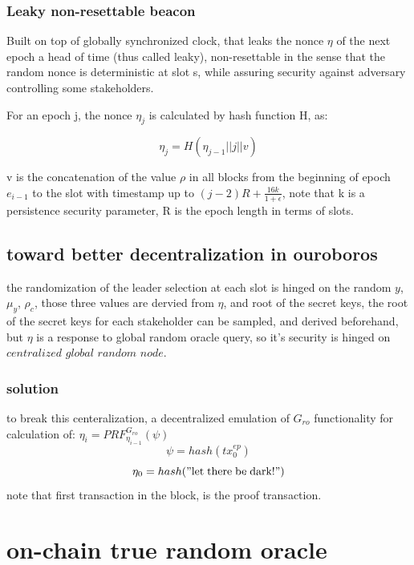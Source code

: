 \documentclass{article}
\begin{document}
\subsubsection{ Leaky non-resettable beacon}

Built on top of globally synchronized clock, that leaks the nonce $\eta$
of the next epoch a head of time (thus called leaky), non-resettable
in the sense that the random nonce is deterministic at slot s, while
assuring security against adversary controlling some stakeholders.

For an epoch j, the nonce $\eta_j$ is calculated by hash function H, as:

$$\eta_j = H(\eta_{j-1}||j||v)$$

v is the concatenation of the value $\rho$ in all blocks from the
beginning of epoch $e_{i-1}$ to the slot with timestamp up to $(j-2)R +
\frac{16k}{1+\epsilon}$, note that k is a persistence security parameter,
R is the epoch length in terms of slots.

\subsection {toward better decentralization in ouroboros}

the randomization of the leader selection at each slot is hinged on the random $y$, $\mu_y$, $\rho_c$, those three values are dervied from $\eta$, and root of the secret keys, the root of the secret keys for each stakeholder can be sampled, and derived beforehand, but $\eta$ is a response to global random oracle query, so it's security is hinged on $\textit{centralized global random node}$.

\subsubsection{ solution}

to break this centeralization, a decentralized emulation of $G_{ro}$ functionality for calculation of: $\eta_i=PRF^{G_{ro}}_{\eta_{i-1}}(\psi)$
$$\psi   =  hash(tx^{ep}_{0})$$
$$\eta_0 =  hash(\mathrm{"let\; there\; be\; dark!"})$$
note that first transaction in the block, is the proof transaction.


\section {on-chain true random oracle}
\end{document}
